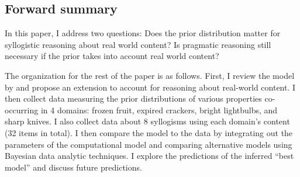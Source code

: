\documentclass{llncs} %
\begin{document}
\subsection{Forward summary}

In this paper, I address two questions: Does the prior distribution matter for syllogistic reasoning about real world content? Is pragmatic reasoning still necessary if the prior takes into account real world content? 

The organization for the rest of the paper is as follows. First, I review the model by  and propose an extension to account for reasoning about real-world content. I then collect data measuring the prior distributions of various properties co-occurring in 4 domains: frozen fruit, expired crackers, bright lightbulbs, and sharp knives. I also collect data about 8 syllogisms using each domain's content (32 items in total). I then compare the model to the data by integrating out the parameters of the computational model and comparing alternative models using Bayesian data analytic techniques. I explore the predictions of the inferred ``best model'' and discuss future predictions. 

%
\end{document}
